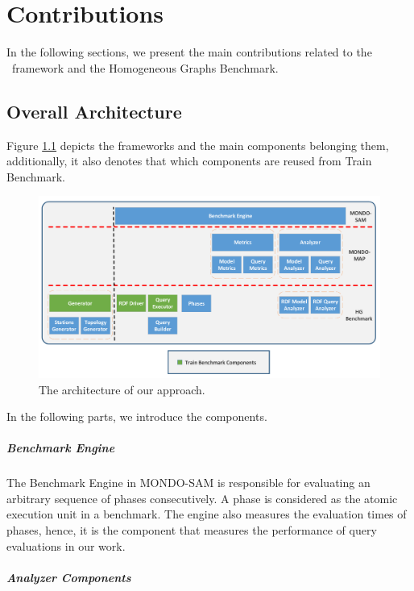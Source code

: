 \chapter{Contributions}

In the following sections, we present the main contributions related to the \framework~framework and the Homogeneous Graphs Benchmark.

\section{Overall Architecture}

Figure \ref{fig:architecture} depicts the frameworks and the main components belonging them, additionally, it also denotes that which components are reused from Train Benchmark.

\begin{figure}[!ht]
	\centering
	\includegraphics[width=150mm, keepaspectratio]{figures/architecture.pdf}
	\caption{The architecture of our approach.}
	\label{fig:architecture}
\end{figure}

In the following parts, we introduce the components.

\paragraph{Benchmark Engine}
The \textsf{Benchmark Engine} in MONDO-SAM is responsible for evaluating an arbitrary sequence of phases consecutively. A phase is considered as the atomic execution unit in a benchmark. The engine also measures the evaluation times of phases, hence, it is the component that measures the performance of query evaluations in our work.

\paragraph{Analyzer Components}

